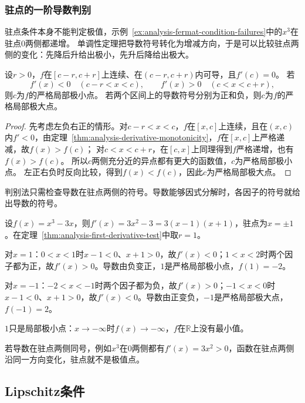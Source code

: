 \subsubsection{驻点的一阶导数判别}
驻点条件本身不能判定极值，示例~\ref{ex:analysis-fermat-condition-failures}中的$x^3$在驻点$0$两侧都递增。
单调性定理把导数符号转化为增减方向，于是可以比较驻点两侧的变化：先降后升给出极小，先升后降给出极大。
\begin{theorem}[驻点的一阶导数判别]
\label{thm:analysis-first-derivative-test}
设$r>0$，$f$在$[c-r,c+r]$上连续、在$(c-r,c+r)$内可导，且$f'(c)=0$。
若
\[
 f'(x)<0\quad(c-r<x<c),\qquad
 f'(x)>0\quad(c<x<c+r),
\]
则$c$为$f$的严格局部极小点。
若两个区间上的导数符号分别为正和负，则$c$为$f$的严格局部极大点。
\end{theorem}
\begin{proof}
先考虑左负右正的情形。对$c-r<x<c$，$f$在$[x,c]$上连续，且在$(x,c)$内$f'<0$，由定理~\ref{thm:analysis-derivative-monotonicity}，$f$在$[x,c]$上严格递减，故$f(x)>f(c)$；
对$c<x<c+r$，在$[c,x]$上同理得到$f$严格递增，也有$f(x)>f(c)$。
所以$c$两侧充分近的异点都有更大的函数值，$c$为严格局部极小点。
左正右负时反向比较，得到$f(x)<f(c)$，因此$c$为严格局部极大点。
\end{proof}
判别法只需检查导数在驻点两侧的符号。导数能够因式分解时，各因子的符号就给出导数的符号。
\begin{example}[$x^3-3x$的驻点]
\label{ex:analysis-cubic-stationary-points}
设$f(x)=x^3-3x$，则$f'(x)=3x^2-3=3(x-1)(x+1)$，驻点为$x=\pm1$。在定理~\ref{thm:analysis-first-derivative-test}中取$r=1$。

对$x=1$：$0<x<1$时$x-1<0$、$x+1>0$，故$f'(x)<0$；$1<x<2$时两个因子都为正，故$f'(x)>0$。导数由负变正，$1$是严格局部极小点，$f(1)=-2$。

对$x=-1$：$-2<x<-1$时两个因子都为负，故$f'(x)>0$；$-1<x<0$时$x-1<0$、$x+1>0$，故$f'(x)<0$。导数由正变负，$-1$是严格局部极大点，$f(-1)=2$。

$1$只是局部极小点：$x\to-\infty$时$f(x)\to-\infty$，$f$在$\mathbb R$上没有最小值。
\end{example}
若导数在驻点两侧同号，例如$x^3$在$0$两侧都有$f'(x)=3x^2>0$，函数在驻点两侧沿同一方向变化，驻点就不是极值点。

\subsection{Lipschitz条件}

